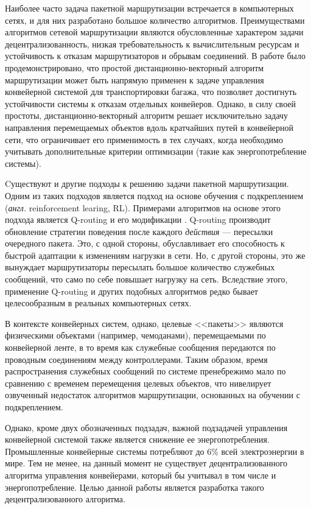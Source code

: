 \documentclass[specification,annotation,times]{itmo-student-thesis}
\theoremstyle{definition}
\begin{document}
Наиболее часто задача пакетной маршрутизации встречается в компьютерных сетях, и
для них разработано большое количество алгоритмов. Преимуществами алгоритмов
сетевой маршрутизации являются обусловленные характером задачи
децентрализованность, низкая требовательность к вычислительным ресурсам и
устойчивость к отказам маршрутизаторов и обрывам
соединений. В работе \cite{vyatkin-controllers} было продемонстрировано, что
простой дистанционно-векторный алгоритм маршрутизации может быть напрямую
применен к задаче управления конвейерной системой для транспортировки багажа,
что позволяет достигнуть устойчивости системы к отказам отдельных конвейеров.
Однако, в силу своей простоты, дистанционно-векторный алгоритм решает
исключительно задачу направления перемещаемых объектов вдоль кратчайших путей в
конвейерной сети, что ограничивает его применимость в тех случаях, когда
необходимо учитывать дополнительные критерии оптимизации (такие как
энергопотребление системы).

Cуществуют и другие подходы к решению задачи пакетной маршрутизации. Одним из
таких подходов является подход на основе обучения с подкреплением
(\textit{англ.} reinforcement learing, RL). Примерами алгоритмов на основе этого
подхода является Q-routing \cite{q-routing-orig} и его модификации
\cite{predictive-q-routing, dual-q-routing}. Q-routing производит обновление
стратегии поведения после каждого \textit{действия} --- пересылки очередного
пакета. Это, с одной стороны, обуславливает его способность к быстрой адаптации
к изменениям нагрузки в сети. Но, с другой стороны, это же вынуждает
маршрутизаторы пересылать большое количество служебных сообщений, что само по
себе повышает нагрузку на сеть. Вследствие этого, применение Q-routing и других
подобных алгоритмов редко бывает целесообразным в реальных компьютерных сетях.

В контексте конвейерных систем, однако, целевые <<пакеты>> являются физическими
объектами (например, чемоданами), перемещаемыми по конвейерной ленте, в то время
как служебные сообщения передаются по проводным соединениям между контроллерами.
Таким образом, время распространения служебных сообщений по системе пренебрежимо
мало по сравнению с временем перемещения целевых объектов, что нивелирует
озвученный недостаток алгоритмов маршрутизации, основанных на обучении с
подкреплением.

Однако, кроме двух обозначенных подзадач, важной подзадачей управления
конвейерной системой также является снижение ее энергопотребления. Промышленные
конвейерные системы потребляют до 6\% всей электроэнергии в мире. Тем не менее,
на данный момент не существует децентрализованного алгоритма управления
конвейерами, который бы учитывал в том числе и энергопотребление. Целью данной
работы является разработка такого децентрализованного алгоритма.
\end{document}
